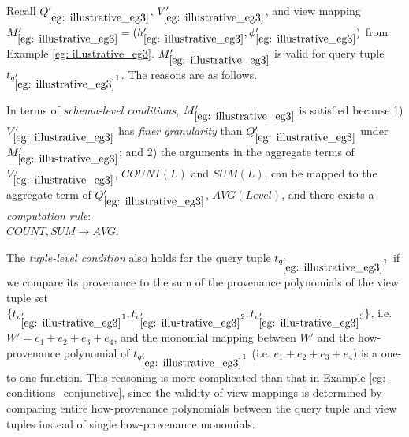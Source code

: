 \begin{example}
Recall $Q_{\ref{eg: illustrative_eg3}}'$, $V_{\ref{eg: illustrative_eg3}}'$, and view mapping $M_{\ref{eg: illustrative_eg3}}'=(h_{\ref{eg: illustrative_eg3}}',\phi_{\ref{eg: illustrative_eg3}}')$ from Example \ref{eg: illustrative_eg3}.
$M_{\ref{eg: illustrative_eg3}}'$
is valid for query tuple $t_{q_{\ref{eg: illustrative_eg3}}'1}$. The reasons are as follows.

In terms of {\em schema-level conditions}, $M_{\ref{eg: illustrative_eg3}}'$ is satisfied because 1) $V_{\ref{eg: illustrative_eg3}}'$ has {\em finer granularity} than $Q_{\ref{eg: illustrative_eg3}}'$ under $M_{\ref{eg: illustrative_eg3}}'$; and 2) the arguments in the aggregate terms of $V_{\ref{eg: illustrative_eg3}}'$, $COUNT(L)$ and $SUM(L)$, can be mapped to the aggregate term of $Q_{\ref{eg: illustrative_eg3}}'$, $AVG(Level)$, and there exists a {\em computation rule}: \\
$COUNT, SUM \rightarrow AVG$.

The {\em tuple-level condition} also holds for the query tuple $t_{q_{\ref{eg: illustrative_eg3}}'1}$ if we compare its provenance to the sum of the provenance polynomials of the view tuple set $\{t_{v_{\ref{eg: illustrative_eg3}}'1}, t_{v_{\ref{eg: illustrative_eg3}}'2}, t_{v_{\ref{eg: illustrative_eg3}}'3}\}$, i.e. 
$W' = e_1 + e_2 + e_3 + e_4$, and the monomial mapping between $W'$ and the how-provenance polynomial of $t_{q_{\ref{eg: illustrative_eg3}}'1}$ (i.e. $e_1 + e_2 + e_3 + e_4$) is a one-to-one function.  
This reasoning is more complicated than that in Example \ref{eg: conditions_conjunctive}, since the validity of view mappings is determined by comparing entire how-provenance polynomials between the query tuple and view tuples instead of single how-provenance monomials.



\end{example}

